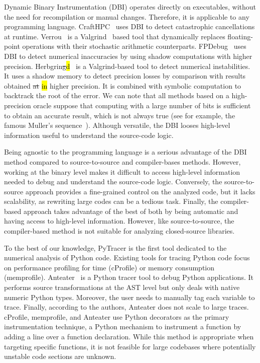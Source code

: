 \documentclass[10pt,journal,compsoc]{IEEEtran}
\newcommand{\pytracer}[0]{PyTracer\xspace}
\DeclareRobustCommand{\add}[1]{\sethlcolor{lightgreen}\hl{#1}}
\DeclareRobustCommand{\remove}[1]{\textcolor{lightred}{\sout{#1}}}
\DeclareRobustCommand{\add}[1]{#1}
\DeclareRobustCommand{\remove}[1]{}
\begin{document}
Dynamic Binary Instrumentation (DBI) operates directly on executables, without
the need for recompilation or manual changes. Therefore, it is applicable to any
programming language. CraftHPC~\cite{lam2013dynamic} uses DBI to detect
catastrophic cancellations at runtime. Verrou~\cite{fevotte2016verrou} is a
Valgrind~\cite{nethercote2007valgrind} based tool that dynamically replaces
floating-point operations with their stochastic arithmetic counterparts.
FPDebug~\cite{benz2012dynamic} uses DBI to detect numerical inaccuracies by
using shadow computations with higher precision.
Herbgrin\remove{g}\add{d}~\cite{sanchez2017finding} is a Valgrind-based tool to
detect numerical instabilities. It uses a shadow memory to detect precision
losses by comparison with results obtained \remove{at} \add{in} higher
precision. It is combined with symbolic computation to backtrack the root of the
error. We can note that all methods based on a high-precision oracle suppose
that computing with a large number of bits is sufficient to obtain an accurate
result, which is not always true (see for example, the famous Muller's
sequence~\cite{bajard1996introduction}). Although versatile, the DBI looses
high-level information useful to understand the source-code logic.

Being agnostic to the programming language is a serious advantage of the DBI
method compared to source-to-source and compiler-bases methods. However, working
at the binary level makes it difficult to access high-level information needed
to debug and understand the source-code logic. Conversely, the source-to-source
approach provides a fine-grained control on the analyzed code, but it lacks
scalability, as rewriting large codes can be a tedious task. Finally, the
compiler-based approach takes advantage of the best of both by being automatic
and having access to high-level information. However, like source-to-source, the
compiler-based method is not suitable for analyzing closed-source libraries.

To the best of our knowledge, \pytracer is the first tool dedicated to the
numerical analysis of Python code. Existing tools for tracing Python code focus
on performance profiling for time (cProfile) or memory consumption (memprofile).
Anteater~\cite{faust2019anteater} is a Python tracer tool to debug Python
applications. It performs source transformations at the AST level but only deals
with native numeric Python types. Moreover, the user needs to manually tag each
variable to trace. Finally, according to the authors, Anteater does not scale to
large traces. cProfile, memprofile, and Anteater use Python decorators as the
primary instrumentation technique, a Python mechanism to instrument a function
by adding a line over a function declaration. While this method is appropriate
when targeting specific functions, it is not feasible for large codebases where
potentially unstable code sections are unknown.
\end{document}
